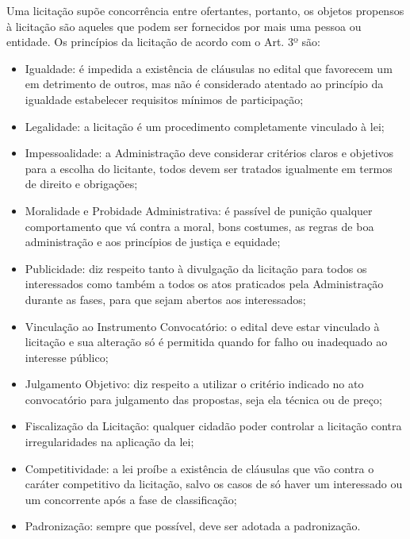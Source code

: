 Uma licitação supõe concorrência entre ofertantes, portanto, os objetos propensos à licitação são aqueles que podem ser fornecidos por mais uma pessoa ou entidade. Os princípios da licitação de acordo com o Art. 3º são:
\begin{itemize}
\item Igualdade: é impedida a existência de cláusulas no edital que favorecem um em detrimento de outros, mas não é considerado atentado ao princípio da igualdade estabelecer requisitos mínimos de participação;
\item Legalidade: a licitação é um procedimento completamente vinculado à lei;
\item Impessoalidade: a Administração deve considerar critérios claros e objetivos para a escolha do licitante, todos devem ser tratados igualmente em termos de direito e obrigações;
\item Moralidade e Probidade Administrativa: é passível de punição qualquer comportamento que vá contra a moral, bons costumes, as regras de boa administração e aos princípios de justiça e equidade;
\item Publicidade: diz respeito tanto à divulgação da licitação para todos os interessados como também a todos os atos praticados pela Administração durante as fases, para que sejam abertos aos interessados;
\item Vinculação ao Instrumento Convocatório: o edital deve estar vinculado à licitação e sua alteração só é permitida quando for falho ou inadequado ao interesse público;
\item Julgamento Objetivo: diz respeito a utilizar o critério indicado no ato convocatório para julgamento das propostas, seja ela técnica ou de preço;
\item Fiscalização da Licitação: qualquer cidadão poder controlar a licitação contra irregularidades na aplicação da lei;
\item Competitividade: a lei proíbe a existência de cláusulas que vão contra o caráter competitivo da licitação, salvo os casos de só haver um interessado ou um concorrente após a fase de classificação;
\item Padronização: sempre que possível, deve ser adotada a padronização.
\end{itemize}

